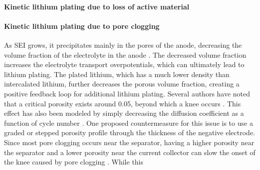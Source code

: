 \documentclass[journal=jpcl, manuscript=article, layout=onecolumn]{achemso}
\begin{document}
\paragraph{Kinetic lithium plating due to loss of active material}

\paragraph{Kinetic lithium plating due to pore clogging}
As SEI grows, it precipitates mainly in the pores of the anode, decreasing the volume fraction of the electrolyte in the anode \cite{sikha_effect_2004}. The decreased volume fraction increases the electrolyte transport overpotentials, which can ultimately lead to lithium plating. The plated lithium, which has a much lower density than intercalated lithium\cite{yang_modeling_2017}, further decreases the porous volume fraction, creating a positive feedback loop for additional lithium plating\cite{yang_modeling_2017}. Several authors have noted that a critical porosity exists around 0.05, beyond which a knee occurs \cite{yang_modeling_2017, muller_model-based_2019}. This effect has also been modeled by simply decreasing the diffusion coefficient as a function of cycle number \cite{keil_electrochemical_2020}. One proposed countermeasure for this issue is to use a graded or stepped porosity profile through the thickness of the negative electrode. Since most pore clogging occurs near the separator, having a higher porosity near the separator and a lower porosity near the current collector can slow the onset of the knee caused by pore clogging \cite{muller_model-based_2019}.
While this 
\end{document}
